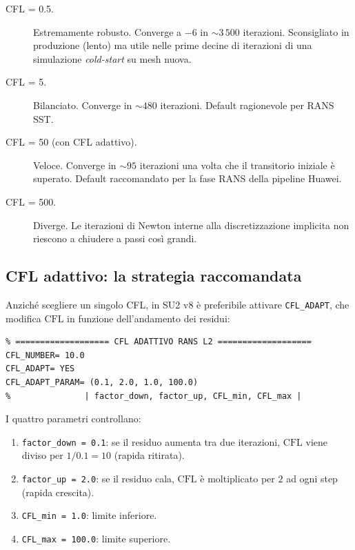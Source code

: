 \documentclass[11pt,a4paper]{article}
\newcommand{\ttcfg}[1]{\texttt{\color{codegray}#1}}
\begin{document}
\begin{description}
  \item[CFL = 0.5.] Estremamente robusto. Converge a $-6$ in
    $\sim 3\,500$ iterazioni. Sconsigliato in produzione (lento) ma utile
    nelle prime decine di iterazioni di una simulazione \emph{cold-start}
    su mesh nuova.
  \item[CFL = 5.] Bilanciato. Converge in $\sim 480$ iterazioni.
    Default ragionevole per RANS SST.
  \item[CFL = 50 (con CFL adattivo).] Veloce. Converge in $\sim 95$
    iterazioni una volta che il transitorio iniziale è superato.
    Default raccomandato per la fase RANS della pipeline Huawei.
  \item[CFL = 500.] Diverge. Le iterazioni di Newton interne alla
    discretizzazione implicita non riescono a chiudere a passi così
    grandi.
\end{description}

\subsection{CFL adattivo: la strategia raccomandata}

Anziché scegliere un singolo CFL, in SU2 v8 è preferibile attivare
\ttcfg{CFL\_ADAPT}, che modifica $\mathrm{CFL}$ in funzione
dell'andamento dei residui:

\begin{lstlisting}
% =================== CFL ADATTIVO RANS L2 ===================
CFL_NUMBER= 10.0
CFL_ADAPT= YES
CFL_ADAPT_PARAM= (0.1, 2.0, 1.0, 100.0)
%               | factor_down, factor_up, CFL_min, CFL_max |
\end{lstlisting}

I quattro parametri controllano:
\begin{enumerate}
  \item \texttt{factor\_down = 0.1}: se il residuo aumenta tra due
    iterazioni, $\mathrm{CFL}$ viene diviso per $1/0.1 = 10$
    (rapida ritirata).
  \item \texttt{factor\_up = 2.0}: se il residuo cala, $\mathrm{CFL}$
    è moltiplicato per $2$ ad ogni step (rapida crescita).
  \item \texttt{CFL\_min = 1.0}: limite inferiore.
  \item \texttt{CFL\_max = 100.0}: limite superiore.
\end{enumerate}
\end{document}
